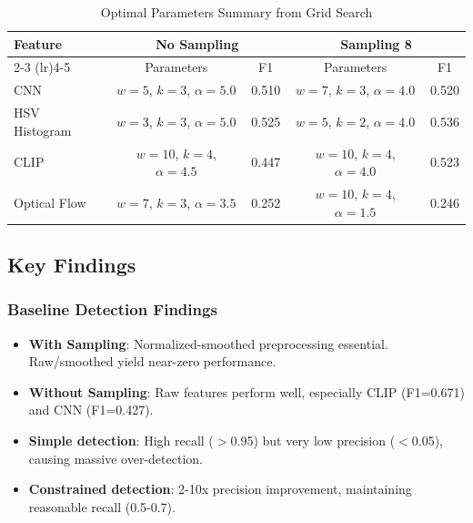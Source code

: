 \documentclass[11pt,a4paper]{article}
\begin{document}
\begin{table}[H]
\centering
\caption{Optimal Parameters Summary from Grid Search}
\label{tab:optimal_params}
\small
\begin{tabular}{lcccc}
\toprule
\textbf{Feature} & \multicolumn{2}{c}{\textbf{No Sampling}} & \multicolumn{2}{c}{\textbf{Sampling 8}} \\
\cmidrule(lr){2-3} \cmidrule(lr){4-5}
 & Parameters & F1 & Parameters & F1 \\
\midrule
CNN & $w=5$, $k=3$, $\alpha=5.0$ & 0.510 & $w=7$, $k=3$, $\alpha=4.0$ & 0.520 \\
HSV Histogram & $w=3$, $k=3$, $\alpha=5.0$ & 0.525 & $w=5$, $k=2$, $\alpha=4.0$ & 0.536 \\
CLIP & $w=10$, $k=4$, $\alpha=4.5$ & 0.447 & $w=10$, $k=4$, $\alpha=4.0$ & 0.523 \\
Optical Flow & $w=7$, $k=3$, $\alpha=3.5$ & 0.252 & $w=10$, $k=4$, $\alpha=1.5$ & 0.246 \\
\bottomrule
\end{tabular}
\end{table}

\subsection{Key Findings}

\subsubsection{Baseline Detection Findings}
\begin{itemize}
    \item \textbf{With Sampling}: Normalized-smoothed preprocessing essential. Raw/smoothed yield near-zero performance.
    \item \textbf{Without Sampling}: Raw features perform well, especially CLIP (F1=0.671) and CNN (F1=0.427).
    \item \textbf{Simple detection}: High recall ($>$0.95) but very low precision ($<$0.05), causing massive over-detection.
    \item \textbf{Constrained detection}: 2-10x precision improvement, maintaining reasonable recall (0.5-0.7).
\end{itemize}
\end{document}

